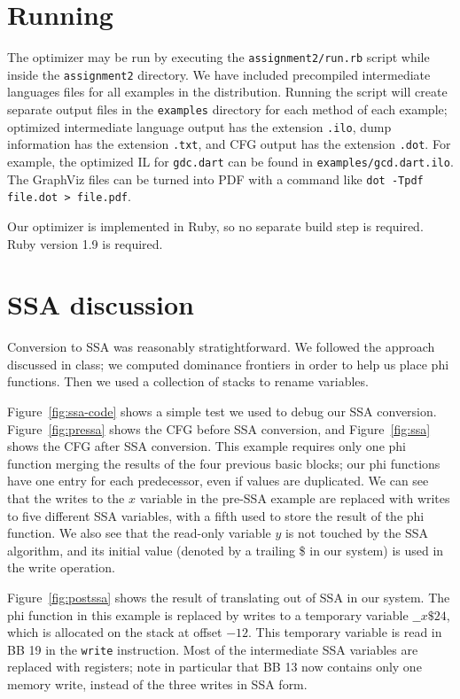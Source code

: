 \documentclass[10pt,twocolumn]{article}
\begin{document}
\section{Running}

The optimizer may be run by executing the \texttt{assignment2/run.rb}
script while inside the \texttt{assignment2} directory. We have
included precompiled intermediate languages files for all examples in
the distribution. Running the script will create separate output files
in the \texttt{examples} directory for each method of each example;
optimized intermediate language output has the extension
\texttt{.ilo}, dump information has the extension \texttt{.txt}, and
CFG output has the extension \texttt{.dot}. For example, the optimized
IL for \texttt{gdc.dart} can be found in
\texttt{examples/gcd.dart.ilo}. The GraphViz files can be turned into
PDF with a command like \texttt{dot -Tpdf file.dot > file.pdf}.

Our optimizer is implemented in Ruby, so no separate build step is
required. Ruby version 1.9 is required.

\section{SSA discussion}

Conversion to SSA was reasonably stratightforward. We followed the
approach discussed in class; we computed dominance frontiers in order
to help us place phi functions. Then we used a collection of stacks to
rename variables.

Figure~\ref{fig:ssa-code} shows a simple test we used to debug our SSA
conversion. Figure~\ref{fig:pressa} shows the CFG before SSA
conversion, and Figure~\ref{fig:ssa} shows the CFG after SSA
conversion. This example requires only one phi function merging the
results of the four previous basic blocks; our phi functions have one
entry for each predecessor, even if values are duplicated. We can see
that the writes to the $x$ variable in the pre-SSA example are
replaced with writes to five different SSA variables, with a fifth
used to store the result of the phi function. We also see that the
read-only variable $y$ is not touched by the SSA algorithm, and its
initial value (denoted by a trailing \$ in our system) is used in the
write operation.

Figure~\ref{fig:postssa} shows the result of translating out of SSA in
our system. The phi function in this example is replaced by writes to
a temporary variable $\_\_x\$24$, which is allocated on the stack at
offset $-12$. This temporary variable is read in BB 19 in the
\texttt{write} instruction. Most of the intermediate SSA variables are
replaced with registers; note in particular that BB 13 now contains
only one memory write, instead of the three writes in SSA form.
\end{document}
